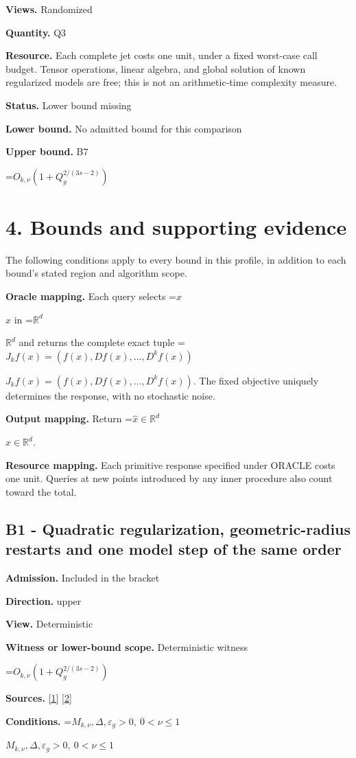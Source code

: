 \documentclass[10pt,a4paper]{article}
\newcommand{\AtlasMath}[1]{\par\begingroup\centering\setbox0=\hbox{$\displaystyle #1$}\ifdim\wd0>1.4\linewidth\typeout{ATLAS WIDE FORMULA: \the\wd0}\fi\ifdim\wd0>\linewidth\resizebox{\linewidth}{!}{\box0}\else\box0\fi\par\endgroup}
\newcommand{\AtlasInlineMath}[1]{\begingroup\setbox0=\hbox{$#1$}\ifdim\wd0>.4\linewidth\endgroup\AtlasMath{#1}\else\endgroup$#1$\fi}
\begin{document}
\textbf{Views.} Randomized

\textbf{Quantity.} Q3

\textbf{Resource.} Each complete jet costs one unit, under a fixed worst-case call budget. Tensor operations, linear algebra, and global solution of known regularized models are free; this is not an arithmetic-time complexity measure.

\textbf{Status.} Lower bound missing

\textbf{Lower bound.} No admitted bound for this comparison

\textbf{Upper bound.} B7

\AtlasMath{O_{k,\nu}(1+Q_g^{2/(3s-2)})}
\section{4. Bounds and supporting evidence}
The following conditions apply to every bound in this profile, in addition to each bound's stated region and algorithm scope.

\textbf{Oracle mapping.} Each query selects \AtlasInlineMath{x} in \AtlasInlineMath{\mathbb{R}^d} and returns the complete exact tuple \AtlasInlineMath{J_{k}f(x)=(f(x),Df(x),\ldots,D^{k}f(x))}. The fixed objective uniquely determines the response, with no stochastic noise.

\textbf{Output mapping.} Return \AtlasInlineMath{\widehat{x}\in \mathbb{R}^d}.

\textbf{Resource mapping.} Each primitive response specified under ORACLE costs one unit. Queries at new points introduced by any inner procedure also count toward the total.

\subsection{B1 - Quadratic regularization, geometric-radius restarts and one model step of the same order}
\textbf{Admission.} Included in the bracket

\textbf{Direction.} upper

\textbf{View.} Deterministic

\textbf{Witness or lower-bound scope.} Deterministic witness

\AtlasMath{O_{k,\nu}(1+Q_g^{2/(3s-2)})}
\textbf{Sources.} \href{https://arxiv.org/pdf/2411.08987v2}{[1]} \href{https://arxiv.org/pdf/2205.09647v1}{[2]}

\textbf{Conditions.} \AtlasInlineMath{M_{k,\nu},\Delta,\varepsilon_g>0,\ 0<\nu\le1}
\end{document}
